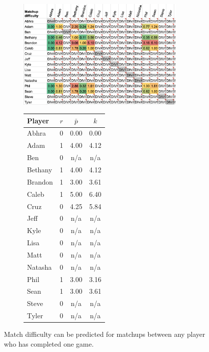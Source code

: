 \documentclass[letterpaper, 10 pt, conference]{ieeeconf}  %
\begin{document}
\begin{figure}[hb]
        \centering
        \begin{subfigure}[h]{0.5\textwidth}
        \includegraphics[width=0.9\textwidth]{fig/difficulty_1.png}
        \end{subfigure}
        \begin{subfigure}[h]{0.4\textwidth}
                \footnotesize
                \centering
                \begin{tabular}{lccc}
                        \toprule
                        Player  & $r$   & $\bar{p}$ & $k$ \\
                        \midrule
                        Abhra	& 0	& 0.00	& 0.00 \\
                        Adam	& 1	& 4.00	& 4.12 \\
                        Ben	& 0	& n/a	& n/a  \\
                        Bethany	& 1	& 4.00	& 4.12 \\
                        Brandon	& 1	& 3.00	& 3.61 \\
                        Caleb	& 1	& 5.00	& 6.40 \\
                        Cruz	& 0	& 4.25	& 5.84 \\
                        Jeff	& 0	& n/a	& n/a  \\
                        Kyle	& 0	& n/a	& n/a  \\
                        Lisa	& 0	& n/a	& n/a  \\
                        Matt	& 0	& n/a	& n/a  \\
                        Natasha	& 0	& n/a	& n/a  \\
                        Phil	& 1	& 3.00	& 3.16 \\
                        Sean	& 1	& 3.00	& 3.61 \\
                        Steve	& 0	& n/a	& n/a  \\
                        Tyler	& 0	& n/a	& n/a  \\
                        \bottomrule
                \end{tabular}
        \end{subfigure}
        \caption{Match difficulty can be predicted for matchups between 
                 any player who has completed one game.}
\end{figure}
\end{document}
